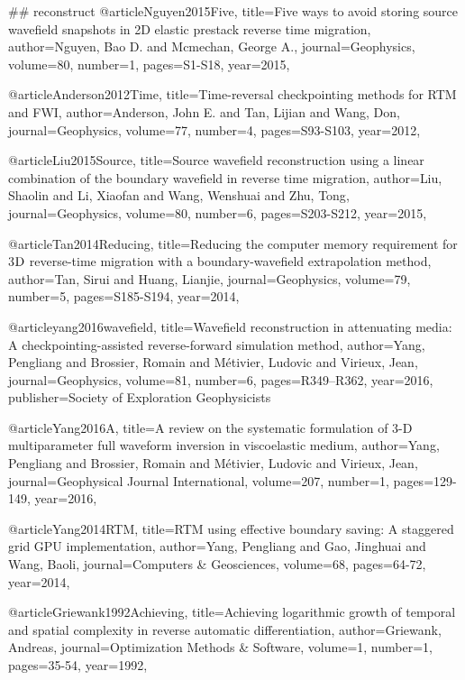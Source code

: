 ## reconstruct
@article{Nguyen2015Five,
  title={Five ways to avoid storing source wavefield snapshots in 2D elastic prestack reverse time migration},
  author={Nguyen, Bao D. and Mcmechan, George A.},
  journal={Geophysics},
  volume={80},
  number={1},
  pages={S1-S18},
  year={2015},
}

@article{Anderson2012Time,
  title={Time-reversal checkpointing methods for {RTM} and {FWI}},
  author={Anderson, John E. and Tan, Lijian and Wang, Don},
  journal={Geophysics},
  volume={77},
  number={4},
  pages={S93-S103},
  year={2012},
}

@article{Liu2015Source,
  title={Source wavefield reconstruction using a linear combination of the boundary wavefield in reverse time migration},
  author={Liu, Shaolin and Li, Xiaofan and Wang, Wenshuai and Zhu, Tong},
  journal={Geophysics},
  volume={80},
  number={6},
  pages={S203-S212},
  year={2015},
}

@article{Tan2014Reducing,
  title={Reducing the computer memory requirement for 3$\textnormal{D}$ reverse-time migration with a boundary-wavefield extrapolation method},
  author={Tan, Sirui and Huang, Lianjie},
  journal={Geophysics},
  volume={79},
  number={5},
  pages={S185-S194},
  year={2014},
}

@article{yang2016wavefield,
  title={Wavefield reconstruction in attenuating media: A checkpointing-assisted reverse-forward simulation method},
  author={Yang, Pengliang and Brossier, Romain and M{\'e}tivier, Ludovic and Virieux, Jean},
  journal={Geophysics},
  volume={81},
  number={6},
  pages={R349--R362},
  year={2016},
  publisher={Society of Exploration Geophysicists}
}

@article{Yang2016A,
  title={A review on the systematic formulation of 3-{D} multiparameter full waveform inversion in viscoelastic medium},
  author={Yang, Pengliang and Brossier, Romain and Métivier, Ludovic and Virieux, Jean},
  journal={Geophysical Journal International},
  volume={207},
  number={1},
  pages={129-149},
  year={2016},
}

@article{Yang2014RTM,
  title={{RTM} using effective boundary saving: A staggered grid GPU implementation},
  author={Yang, Pengliang and Gao, Jinghuai and Wang, Baoli},
  journal={Computers \& Geosciences},
  volume={68},
  pages={64-72},
  year={2014},
}


@article{Griewank1992Achieving,
  title={Achieving logarithmic growth of temporal and spatial complexity in reverse automatic differentiation},
  author={Griewank, Andreas},
  journal={Optimization Methods \& Software},
  volume={1},
  number={1},
  pages={35-54},
  year={1992},
}

